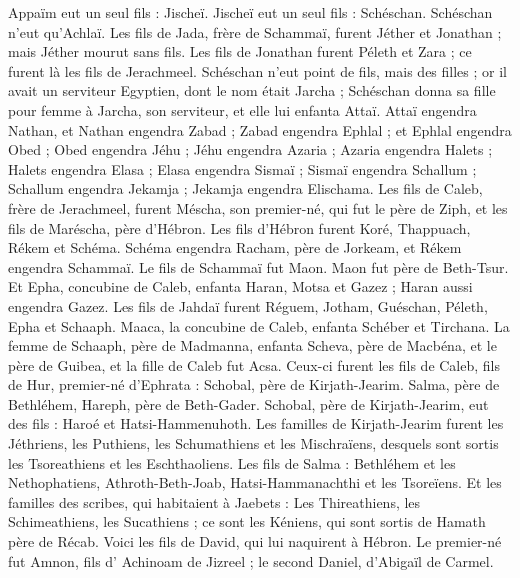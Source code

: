 \begin{multicols}{2}
Appaïm eut un seul fils : Jischeï. Jischeï eut un seul fils : Schéschan. Schéschan n'eut qu'Achlaï.
Les fils de Jada, frère de Schammaï, furent Jéther et Jonathan ; mais Jéther mourut sans fils.
Les fils de Jonathan furent Péleth et Zara ; ce furent là les fils de Jerachmeel.
Schéschan n'eut point de fils, mais des filles ; or il avait un serviteur Egyptien, dont le nom était Jarcha ;
Schéschan donna sa fille pour femme à Jarcha, son serviteur, et elle lui enfanta Attaï.
Attaï engendra Nathan, et Nathan engendra Zabad ;
Zabad engendra Ephlal ; et Ephlal engendra Obed ;
 Obed engendra Jéhu ; Jéhu engendra Azaria ;
Azaria engendra Halets ; Halets engendra Elasa ;
Elasa engendra Sismaï ; Sismaï engendra Schallum ;
Schallum engendra Jekamja ; Jekamja engendra Elischama.
Les fils de Caleb, frère de Jerachmeel, furent Méscha, son premier-né, qui fut le père de Ziph, et les fils de Maréscha, père d'Hébron.
Les fils d'Hébron furent Koré, Thappuach, Rékem et Schéma.
Schéma engendra Racham, père de Jorkeam, et Rékem engendra Schammaï.
Le fils de Schammaï fut Maon. Maon fut père de Beth-Tsur.
Et Epha, concubine de Caleb, enfanta Haran, Motsa et Gazez ; Haran aussi engendra Gazez.
Les fils de Jahdaï furent Réguem, Jotham, Guéschan, Péleth, Epha et Schaaph.
Maaca, la concubine de Caleb, enfanta Schéber et Tirchana.
La femme de Schaaph, père de Madmanna, enfanta Scheva, père de Macbéna, et le père de Guibea, et la fille de Caleb fut Acsa.
Ceux-ci furent les fils de Caleb, fils de Hur, premier-né d'Ephrata : Schobal, père de Kirjath-Jearim.
Salma, père de Bethléhem, Hareph, père de Beth-Gader.
Schobal, père de Kirjath-Jearim, eut des fils : Haroé et Hatsi-Hammenuhoth.
Les familles de Kirjath-Jearim furent les Jéthriens, les Puthiens, les Schumathiens et les Mischraïens, desquels sont sortis les Tsoreathiens et les Eschthaoliens.
Les fils de Salma : Bethléhem et les Nethophatiens, Athroth-Beth-Joab, Hatsi-Hammanachthi et les Tsoreïens.
Et les familles des scribes, qui habitaient à Jaebets : Les Thireathiens, les Schimeathiens, les Sucathiens ; ce sont les Kéniens, qui sont sortis de Hamath père de Récab.
\VerseOne{}Voici les fils de David, qui lui naquirent à Hébron. Le premier-né fut Amnon, fils d' Achinoam de Jizreel ; le second Daniel, d'Abigaïl de Carmel.

\end{multicols}
